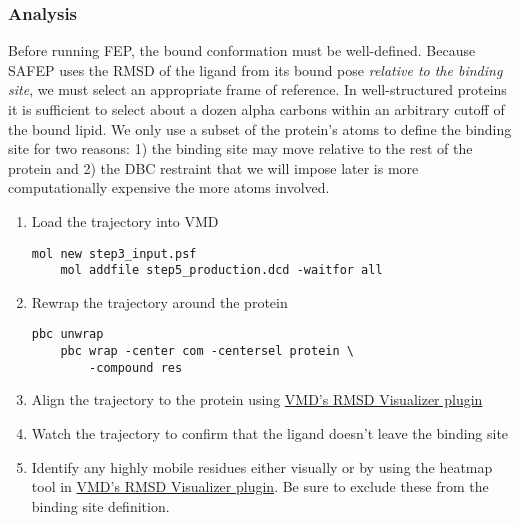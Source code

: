 \documentclass[9pt,tutorial]{Styling/livecoms}
\begin{document}
\subsubsection{Analysis}
\label{sec:analyzeUnbiased}
Before running FEP, the bound conformation must be well-defined. Because SAFEP uses the RMSD of the ligand from its bound pose \textit{relative to the binding site}, we must select an appropriate frame of reference. In well-structured proteins it is sufficient to select about a dozen alpha carbons within an arbitrary cutoff of the bound lipid. We only use a subset of the protein's atoms to define the binding site for two reasons: 1) the binding site may move relative to the rest of the protein and 2) the DBC restraint that we will impose later is more computationally expensive the more atoms involved.
\begin{enumerate}
    \item Load the trajectory into VMD
    \begin{Verbatim}[xleftmargin=-0.25in]
    mol new step3_input.psf
    mol addfile step5_production.dcd -waitfor all
    \end{Verbatim}
    \item Rewrap the trajectory around the protein
    \begin{Verbatim}[xleftmargin=-0.25in]
    pbc unwrap
    pbc wrap -center com -centersel protein \
        -compound res
    \end{Verbatim}
    \item Align the trajectory to the protein using \href{https://www.ks.uiuc.edu/Research/vmd/plugins/rmsdvt/}{VMD's RMSD Visualizer plugin}
    \item Watch the trajectory to confirm that the ligand doesn't leave the binding site
    \item Identify any highly mobile residues either visually or by using the heatmap tool in \href{https://www.ks.uiuc.edu/Research/vmd/plugins/rmsdvt/}{VMD's RMSD Visualizer plugin}. Be sure to exclude these from the binding site definition.
\end{enumerate}
  
\end{document}

